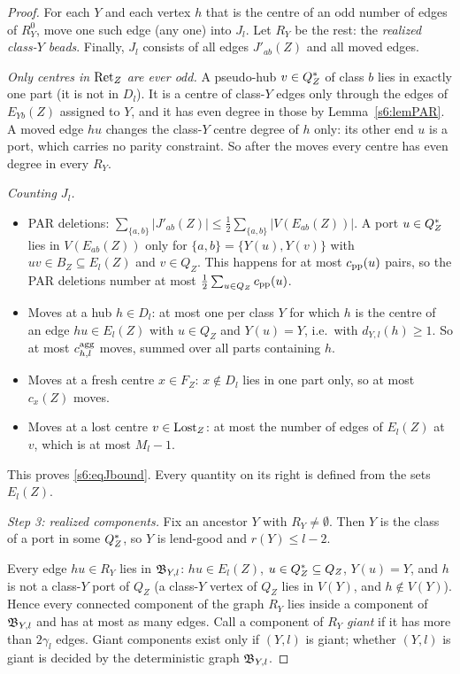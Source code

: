 \begin{proof}
For each $Y$ and each vertex $h$ that is the centre of an odd number of edges of $R^0_Y$, move one such edge (any one) into $J_l$. Let $R_Y$ be the rest: the \emph{realized class-$Y$ beads}. Finally, $J_l$ consists of all edges $J'_{ab}(Z)$ and all moved edges.

\emph{Only centres in $\mathrm{Ret}_Z$ are ever odd.} A pseudo-hub $v\in Q^{*}_Z$ of class $b$ lies in exactly one part (it is not in $D_l$). It is a centre of class-$Y$ edges only through the edges of $E_{Yb}(Z)$ assigned to $Y$, and it has even degree in those by Lemma~\ref{s6:lemPAR}. A moved edge $hu$ changes the class-$Y$ centre degree of $h$ only: its other end $u$ is a port, which carries no parity constraint. So after the moves every centre has even degree in every $R_Y$.

\emph{Counting $J_l$.}
\begin{itemize}
\item PAR deletions: $\sum_{\{a,b\}}|J'_{ab}(Z)|\le\frac12\sum_{\{a,b\}}|V(E_{ab}(Z))|$. A port $u\in Q^{*}_Z$ lies in $V(E_{ab}(Z))$ only for $\{a,b\}=\{Y(u),Y(v)\}$ with $uv\in B_Z\subseteq E_l(Z)$ and $v\in Q_Z$. This happens for at most $c_{\mathrm{pp}}(u)$ pairs, so the PAR deletions number at most $\frac12\sum_{u\in Q_Z}c_{\mathrm{pp}}(u)$.
\item Moves at a hub $h\in D_l$: at most one per class $Y$ for which $h$ is the centre of an edge $hu\in E_l(Z)$ with $u\in Q_Z$ and $Y(u)=Y$, i.e.\ with $d_{Y,l}(h)\ge1$. So at most $c^{\mathrm{agg}}_{h,l}$ moves, summed over all parts containing $h$.
\item Moves at a fresh centre $x\in F_Z$: $x\notin D_l$ lies in one part only, so at most $c_x(Z)$ moves.
\item Moves at a lost centre $v\in\mathrm{Lost}_Z$: at most the number of edges of $E_l(Z)$ at $v$, which is at most $M_l-1$.
\end{itemize}
This proves \eqref{s6:eqJbound}. Every quantity on its right is defined from the sets $E_l(Z)$.

\emph{Step 3: realized components.} Fix an ancestor $Y$ with $R_Y\neq\emptyset$. Then $Y$ is the class of a port in some $Q^{*}_Z$, so $Y$ is lend-good and $r(Y)\le l-2$.

Every edge $hu\in R_Y$ lies in $\mathfrak{B}_{Y,l}$: $hu\in E_l(Z)$, $u\in Q^{*}_Z\subseteq Q_Z$, $Y(u)=Y$, and $h$ is not a class-$Y$ port of $Q_Z$ (a class-$Y$ vertex of $Q_Z$ lies in $V(Y)$, and $h\notin V(Y)$). Hence every connected component of the graph $R_Y$ lies inside a component of $\mathfrak{B}_{Y,l}$ and has at most as many edges. Call a component of $R_Y$ \emph{giant} if it has more than $2\gamma_l$ edges. Giant components exist only if $(Y,l)$ is giant; whether $(Y,l)$ is giant is decided by the deterministic graph $\mathfrak{B}_{Y,l}$.


\end{proof}

